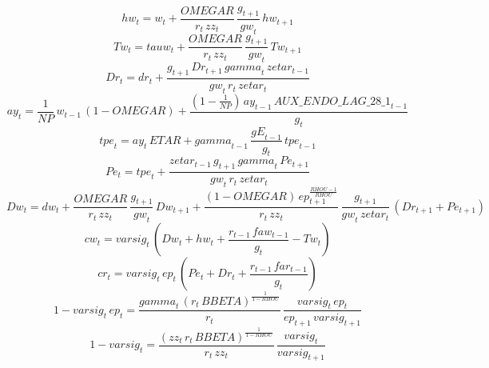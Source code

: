 \begin{dmath}
{hw}_{t}={w}_{t}+\frac{{OMEGAR}}{{r}_{t}\, {zz}_{t}}\, \frac{{g}_{t+1}}{{gw}_{t}}\, {hw}_{t+1}
\end{dmath}
\begin{dmath}
{Tw}_{t}={tauw}_{t}+\frac{{OMEGAR}}{{r}_{t}\, {zz}_{t}}\, \frac{{g}_{t+1}}{{gw}_{t}}\, {Tw}_{t+1}
\end{dmath}
\begin{dmath}
{Dr}_{t}={dr}_{t}+\frac{{g}_{t+1}\, {Dr}_{t+1}\, {gamma}_{t}\, {zetar}_{t-1}}{{gw}_{t}\, {r}_{t}\, {zetar}_{t}}
\end{dmath}
\begin{dmath}
{ay}_{t}=\frac{1}{{NP}}\, {w}_{t-1}\, \left(1-{OMEGAR}\right)+\frac{\left(1-\frac{1}{{NP}}\right)\, {ay}_{t-1}\, {AUX\_ENDO\_LAG\_28\_1}_{t-1}}{{g}_{t}}
\end{dmath}
\begin{dmath}
{tpe}_{t}={ay}_{t}\, {ETAR}+{gamma}_{t-1}\, \frac{{gE}_{t-1}}{{g}_{t}}\, {tpe}_{t-1}
\end{dmath}
\begin{dmath}
{Pe}_{t}={tpe}_{t}+\frac{{zetar}_{t-1}\, {g}_{t+1}\, {gamma}_{t}\, {Pe}_{t+1}}{{gw}_{t}\, {r}_{t}\, {zetar}_{t}}
\end{dmath}
\begin{dmath}
{Dw}_{t}={dw}_{t}+\frac{{OMEGAR}}{{r}_{t}\, {zz}_{t}}\, \frac{{g}_{t+1}}{{gw}_{t}}\, {Dw}_{t+1}+\frac{\left(1-{OMEGAR}\right)\, {ep}_{t+1}^{\frac{{RHOU}-1}{{RHOU}}}}{{r}_{t}\, {zz}_{t}}\, \frac{{g}_{t+1}}{{gw}_{t}\, {zetar}_{t}}\, \left({Dr}_{t+1}+{Pe}_{t+1}\right)
\end{dmath}
\begin{dmath}
{cw}_{t}={varsig}_{t}\, \left({Dw}_{t}+{hw}_{t}+\frac{{r}_{t-1}\, {faw}_{t-1}}{{g}_{t}}-{Tw}_{t}\right)
\end{dmath}
\begin{dmath}
{cr}_{t}={varsig}_{t}\, {ep}_{t}\, \left({Pe}_{t}+{Dr}_{t}+\frac{{r}_{t-1}\, {far}_{t-1}}{{g}_{t}}\right)
\end{dmath}
\begin{dmath}
1-{varsig}_{t}\, {ep}_{t}=\frac{{gamma}_{t}\, \left({r}_{t}\, {BBETA}\right)^{\frac{1}{1-{RHOU}}}}{{r}_{t}}\, \frac{{varsig}_{t}\, {ep}_{t}}{{ep}_{t+1}\, {varsig}_{t+1}}
\end{dmath}
\begin{dmath}
1-{varsig}_{t}=\frac{\left({zz}_{t}\, {r}_{t}\, {BBETA}\right)^{\frac{1}{1-{RHOU}}}}{{r}_{t}\, {zz}_{t}}\, \frac{{varsig}_{t}}{{varsig}_{t+1}}
\end{dmath}
